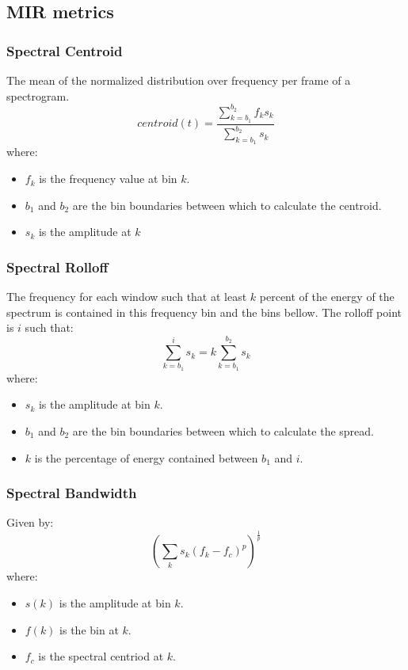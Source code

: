 \documentclass[a4paper, 12pt, twoside]{report}
\begin{document}
\subsection{MIR metrics}
\label{sec:org59595af}
\subsubsection{Spectral Centroid}
\label{sec:org722ed3e}

    The mean of the normalized distribution over frequency per frame of a spectrogram.
    \[ centroid(t) = \frac{\sum^{b_{2}}_{k=b_{1}}f_{k}s_{k}}{\sum^{b_{2}}_{k=b_{1}}s_{k}} \]
    where:
    \begin{itemize}
      \item $f_{k}$ is the frequency value at bin $k$.
      \item $b_{1}$ and $b_{2}$ are the bin boundaries between which to calculate the centroid.
      \item $s_{k}$ is the amplitude at $k$
    \end{itemize}

\subsubsection{Spectral Rolloff}
\label{sec:org8ba1512}

    The frequency for each window such that at least $k$ percent of the energy of the spectrum is contained in this frequency bin and the bins bellow. The rolloff point is $i$ such that:
    \[ \sum^{i}_{k=b_{1}}s_{k} = k\sum^{b_{2}}_{k=b_{1}}s_{k} \]
    where:
    \begin{itemize}
      \item $s_{k}$ is the amplitude at bin $k$.
      \item $b_{1}$ and $b_{2}$ are the bin boundaries between which to calculate the spread.
      \item $k$ is the percentage of energy contained between $b_{1}$ and $i$.
    \end{itemize}

\subsubsection{Spectral Bandwidth }
\label{sec:org9dcacf6}

    Given by:
    \[ (\sum_{k}s_{k}(f_{k} - f_{c})^{p})^{\frac{1}{p}}\]
    where:
    \begin{itemize}
      \item $s( k )$ is the amplitude at bin $k$.
      \item $f( k )$ is the bin at $k$.
      \item $f_{c}$ is the spectral centriod at $k$.
    \end{itemize}
\end{document}
